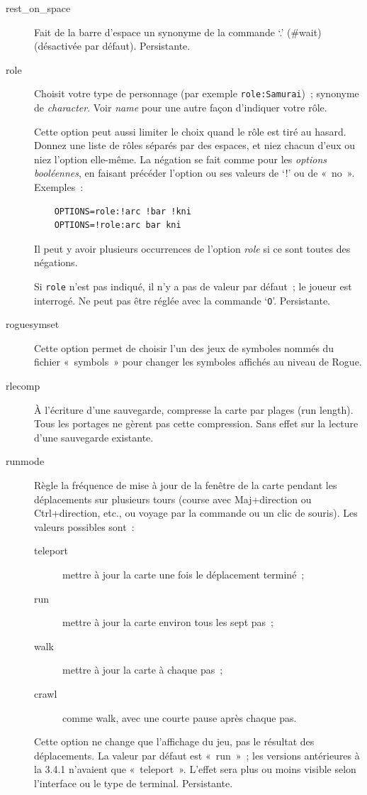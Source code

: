 \documentclass[titlepage]{article}
\begin{document}
\begin{description}
\item[{rest\_on\_space}]
Fait de la barre d'espace un synonyme de la commande `.' (\#wait)
(désactivée par défaut).
Persistante.

\item[{role}]
Choisit votre type de personnage (par exemple \texttt{role:Samurai})~;
synonyme de
\textit{character}.
Voir
\textit{name}
pour une autre façon d'indiquer votre rôle.


Cette option peut aussi limiter le choix quand le rôle est tiré au hasard.
Donnez une liste de rôles séparés par des espaces, et niez chacun d'eux ou
niez l'option elle-même.
La négation se fait comme pour les \textit{options booléennes}, en faisant
précéder l'option ou ses valeurs de `!' ou de «~no~».
\medskip
Exemples~:
\begin{verbatim}
    OPTIONS=role:!arc !bar !kni
    OPTIONS=!role:arc bar kni
\end{verbatim}
Il peut y avoir plusieurs occurrences de l'option
\textit{role}
si ce sont toutes des négations.


Si \texttt{role} n'est pas indiqué, il n'y a pas de valeur par défaut~; le
joueur est interrogé.
Ne peut pas être réglée avec la commande `\texttt{O}'.
Persistante.

\item[{roguesymset}]
Cette option permet de choisir l'un des jeux de symboles nommés du fichier
«~symbols~» pour changer les symboles affichés au niveau de Rogue.

\item[{rlecomp}]
À l'écriture d'une sauvegarde, compresse la carte par plages (run
length).
Tous les portages ne gèrent pas cette compression.
Sans effet sur la lecture d'une sauvegarde existante.

\item[{runmode}]
Règle la fréquence de mise à jour de la fenêtre de la carte pendant les
déplacements sur plusieurs tours (course avec Maj+direction ou
Ctrl+direction, etc., ou voyage par la commande ou un clic de souris).
Les valeurs possibles sont~:
\begin{description}
\item[{teleport}]
mettre à jour la carte une fois le déplacement terminé~;
\item[{run}]
mettre à jour la carte environ tous les sept pas~;
\item[{walk}]
mettre à jour la carte à chaque pas~;
\item[{crawl}]
comme walk, avec une courte pause après chaque pas.
\end{description}
Cette option ne change que l'affichage du jeu, pas le résultat des
déplacements.
La valeur par défaut est «~run~»~; les versions antérieures à la 3.4.1
n'avaient que «~teleport~».
L'effet sera plus ou moins visible selon l'interface ou le type de
terminal.
Persistante.


\end{description}
\end{document}
